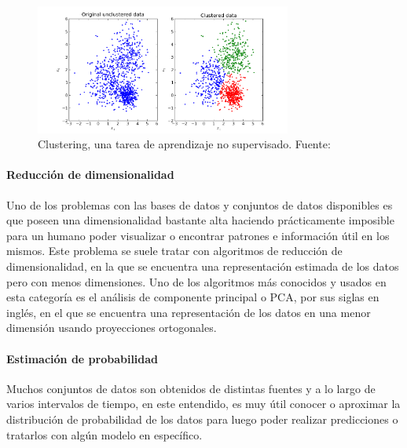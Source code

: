             \begin{figure}[!h] 
                \centering
                \includegraphics[width=0.75\textwidth]{img/clustering}
                \caption{Clustering, una tarea de aprendizaje no supervisado. Fuente: \cite{viswarupan_2017} }
                \label{fig:clustering}
            \end{figure}

            \paragraph{Reducción de dimensionalidad}
            Uno de los problemas con las bases de datos y conjuntos de datos disponibles es que poseen una dimensionalidad 
            bastante alta haciendo prácticamente imposible para un humano poder visualizar o encontrar patrones e información 
            útil en los mismos. Este problema se suele tratar con algoritmos de reducción de dimensionalidad, en la que 
            se encuentra una representación estimada de los datos pero con menos dimensiones. Uno de los algoritmos más 
            conocidos y usados en esta categoría es el análisis de componente principal o PCA, por sus siglas en inglés, en el 
            que se encuentra una representación de los datos en una menor dimensión usando proyecciones ortogonales.

            \paragraph{Estimación de probabilidad}
            Muchos conjuntos de datos son obtenidos de distintas fuentes y a lo largo de varios intervalos de tiempo, en este 
            entendido, es muy útil conocer o aproximar la distribución de probabilidad de los datos para luego poder realizar 
            predicciones o tratarlos con algún modelo en específico.

